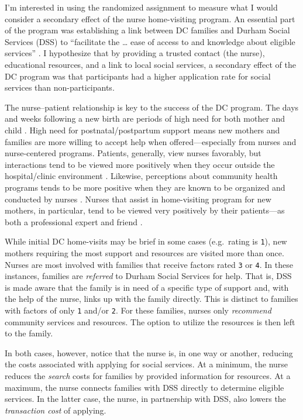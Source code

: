 \documentclass[12pt,letterpaperpaper,]{book}
\begin{document}
I'm interested in using the randomized assignment to measure what I
would consider a secondary effect of the nurse home-visiting program. An
essential part of the program was establishing a link between DC
families and Durham Social Services (DSS) to ``facilitate the \ldots{}
ease of access to and knowledge about eligible services''
\citep{odonnell_family_2015}. I hypothesize that by providing a trusted
contact (the nurse), educational resources, and a link to local social
services, a secondary effect of the DC program was that participants had
a higher application rate for social services than non-participants.

The nurse--patient relationship is key to the success of the DC program.
The days and weeks following a new birth are periods of high need for
both mother and child \citep{organization_who_2013, evans_cohort_2001}.
High need for postnatal/postpartum support means new mothers and
families are more willing to accept help when offered---especially from
nurses and nurse-centered programs. Patients, generally, view nurses
favorably, but interactions tend to be viewed more positively when they
occur outside the hospital/clinic environment
\citep{jansson_first-time_2002}. Likewise, perceptions about community
health programs tends to be more positive when they are known to be
organized and conducted by nurses \citep{kneipp_reasons_2009}. Nurses
that assist in home-visiting program for new mothers, in particular,
tend to be viewed very positively by their patients---as both a
professional expert and friend \citep{landy_mothers_2012}.

While initial DC home-visits may be brief in some cases (e.g.~rating is
\texttt{1}), new mothers requiring the most support and resources are
visited more than once. Nurses are most involved with families that
receive factors rated \texttt{3} or \texttt{4}. In these instances,
families are \emph{referred} to Durham Social Services for help. That
is, DSS is made aware that the family is in need of a specific type of
support and, with the help of the nurse, links up with the family
directly. This is distinct to families with factors of only \texttt{1}
and/or \texttt{2}. For these families, nurses only \emph{recommend}
community services and resources. The option to utilize the resources is
then left to the family.

In both cases, however, notice that the nurse is, in one way or another,
reducing the costs associated with applying for social services. At a
minimum, the nurse reduces the \emph{search} costs for families by
provided information for resources. At a maximum, the nurse connects
families with DSS directly to determine eligible services. In the latter
case, the nurse, in partnership with DSS, also lowers the
\emph{transaction cost} of applying.
\end{document}
